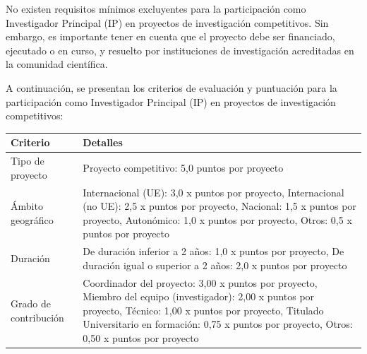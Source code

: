 \documentclass{article}
\begin{document}
\begin{itemize}
\begin{itemize}
                No existen requisitos mínimos excluyentes para la participación como Investigador Principal (IP) en proyectos de investigación competitivos. Sin embargo, es importante tener en cuenta que el proyecto debe ser financiado, ejecutado o en curso, y resuelto por instituciones de investigación acreditadas en la comunidad científica.

                A continuación, se presentan los criterios de evaluación y puntuación para la participación como Investigador Principal (IP) en proyectos de investigación competitivos:

                \vspace{0.4cm}
                \begin{table}[h!]\centering\renewcommand{\arraystretch}{1.3}
                  \begin{tabular}{|p{}|p{}|}\hline
                    Criterio              & Detalles                                                                                                                                                                                                                                                     \\\hline
                    Tipo de proyecto      & Proyecto competitivo: 5,0 puntos por proyecto                                                                                                                                                                                                                \\\hline
                    Ámbito geográfico     & Internacional (UE): 3,0 x puntos por proyecto, Internacional (no UE): 2,5 x puntos por proyecto, Nacional: 1,5 x puntos por proyecto, Autonómico: 1,0 x puntos por proyecto, Otros: 0,5 x puntos por proyecto                                                \\\hline
                    Duración              & De duración inferior a 2 años: 1,0 x puntos por proyecto, De duración igual o superior a 2 años: 2,0 x puntos por proyecto                                                                                                                                   \\\hline
                    Grado de contribución & Coordinador del proyecto: 3,00 x puntos por proyecto, Miembro del equipo (investigador): 2,00 x puntos por proyecto, Técnico: 1,00 x puntos por proyecto, Titulado Universitario en formación: 0,75 x puntos por proyecto, Otros: 0,50 x puntos por proyecto \\\hline
                  \end{tabular}\end{table}
                \vspace{0.4cm}


\end{itemize}
\end{itemize}
\end{document}
